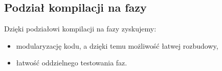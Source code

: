 \documentclass{documentation}
\begin{document}
\subsection{Podział kompilacji na fazy}
\noindent Dzięki podziałowi kompilacji na fazy zyskujemy:
\begin{itemize}
    \item modularyzację kodu, a dzięki temu możliwość łatwej rozbudowy,
    \item łatwość oddzielnego testowania faz.
\end{itemize}
\end{document}
